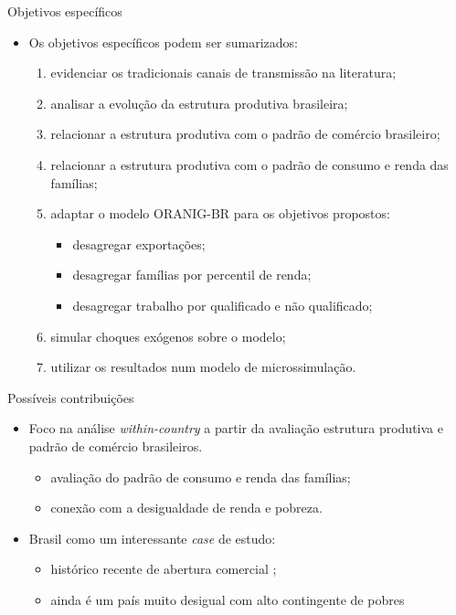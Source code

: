 \documentclass[10pt]{sintefbeamer}
\begin{document}
\begin{frame}{Objetivos específicos}
	\begin{itemize}
		\item Os objetivos específicos podem ser sumarizados:
		
		\begin{enumerate}[<+->]
			\item evidenciar os tradicionais canais de transmissão na literatura;
			\item analisar a evolução da estrutura produtiva brasileira;
			\item relacionar a estrutura produtiva com o padrão de comércio brasileiro;
			\item relacionar a estrutura produtiva com o padrão de consumo e renda das famílias;
			\item adaptar o modelo ORANIG-BR para os objetivos propostos:
			\begin{itemize}
				\item desagregar exportações;
				\item desagregar famílias por percentil de renda;
				\item desagregar trabalho por qualificado e não qualificado;
			\end{itemize}
			\item simular choques exógenos sobre o modelo;
			\item utilizar os resultados num modelo de microssimulação.
		\end{enumerate}
	\end{itemize}
\end{frame}


\begin{frame}{Possíveis contribuições}
	\begin{itemize}[<+->]
		\item Foco na análise \textit{within-country} a partir da avaliação estrutura produtiva e padrão de comércio brasileiros.
		
		\begin{itemize}
			\item avaliação do padrão de consumo e renda das famílias;
			
			\item conexão com a desigualdade de renda e pobreza.
		\end{itemize}
		
		\item Brasil como um interessante \textit{case} de estudo:
		
		\begin{itemize}
			\item histórico recente de abertura comercial \cite{pavcnik17};
			
			\item ainda é um país muito desigual com alto contingente de pobres \cite{ocde15}
		\end{itemize}		
	\end{itemize}
\end{frame}
\end{document}
